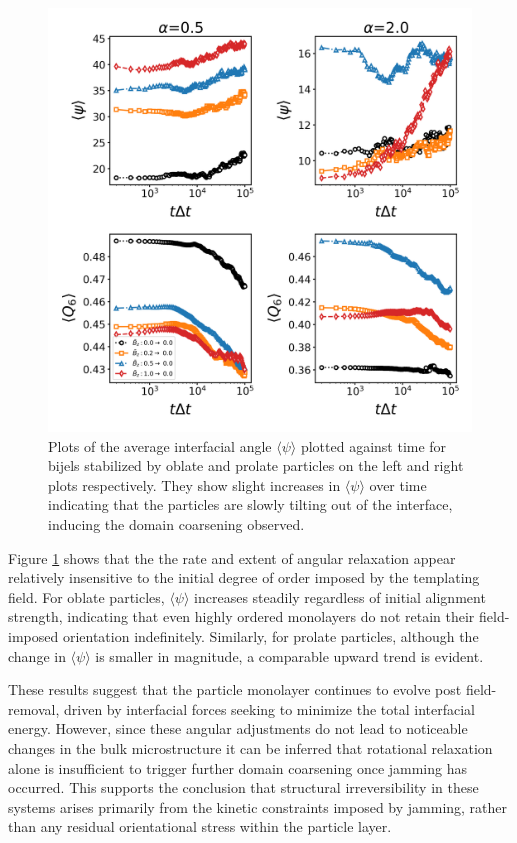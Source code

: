\begin{figure} 
\centering 
\includegraphics[scale=0.4]{../figures/results/paper2/interface_angle-nint-field_down.png} 
\caption{Plots of the average interfacial angle $\langle \psi \rangle$  plotted against time for bijels stabilized by oblate and prolate particles
         on the left and right plots respectively. They show slight increases in $\langle \psi \rangle$ over time indicating that the particles are
         slowly tilting out of the interface, inducing the domain coarsening observed.} 
\label{fig:interface_angle-field_down} 
\end{figure}

Figure \ref{fig:interface_angle-field_down} shows that the the rate and extent of angular relaxation appear relatively insensitive to the initial degree of 
order imposed by the templating field. For oblate particles, \(\langle \psi \rangle\) increases steadily regardless of initial alignment strength, indicating that 
even highly ordered monolayers do not retain their field-imposed orientation indefinitely. Similarly, for prolate particles, although the change in 
\(\langle \psi \rangle\) is smaller in magnitude, a comparable upward trend is evident.

These results suggest that the particle monolayer continues to evolve post field-removal, driven by interfacial forces seeking to minimize the total interfacial 
energy. However, since these angular adjustments do not lead to noticeable changes in the bulk microstructure it can be 
inferred that rotational relaxation alone is insufficient to trigger further domain coarsening once jamming has occurred. This supports the conclusion that 
structural irreversibility in these systems arises primarily from the kinetic constraints imposed by jamming, rather than any residual orientational stress 
within the particle layer.

